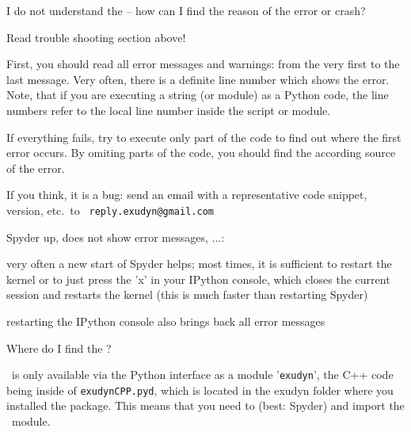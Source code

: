 \ei
\item I do not understand the  -- how can I find the reason of the error or crash?
\bi
\item[$\ra$] Read trouble shooting section above! 
\item[$\ra$] First, you should read all error messages and warnings: from the very first to the last message. Very often, there is a definite line number which shows the error. Note, that if you are executing a string (or module) as a Python code, the line numbers refer to the local line number inside the script or module.
\item[$\ra$] If everything fails, try to execute only part of the code to find out where the first error occurs. By omiting parts of the code, you should find the according source of the error.
\item[$\ra$] If you think, it is a bug: send an email with a representative code snippet, version, etc.\ to \texttt{ reply.exudyn@gmail.com}
\ei
\item Spyder  up, does not show error messages, ...:
\bi
\item[$\ra$] very often a new start of Spyder helps; most times, it is sufficient to restart the kernel or to just press the 'x' in your IPython console, which closes the current session and restarts the kernel (this is much faster than restarting Spyder)
\item[$\ra$] restarting the IPython console also brings back all error messages
\ei
\item Where do I find the ?
\bi
\item[$\ra$] \codeName\ is only available via the Python interface as a module '\texttt{exudyn}', the C++ code being inside of \texttt{exudynCPP.pyd}, which is located in the exudyn folder where you installed the package. This means that you need to  (best: Spyder) and import the \codeName\ module.
\ei
